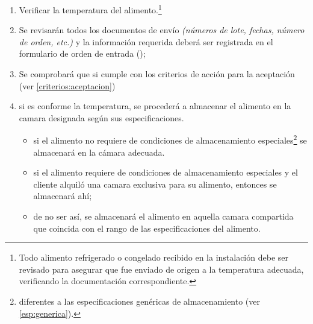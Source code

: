 \begin{enumerate}
\begin{itemize}
		\end{itemize}
	\item Verificar la temperatura del alimento.\footnote{Todo alimento refrigerado o congelado recibido en la instalación debe ser revisado para asegurar que fue enviado de origen a la temperatura adecuada, verificando la documentación correspondiente.}
	\item Se revisarán todos los documentos de envío \emph{(números de lote, fechas, número de orden, etc.)} y la información requerida deberá ser registrada en el formulario de orden de entrada (\Oent);
	\item Se comprobará que si cumple con los criterios de acción para la aceptación (ver \cref{criterios:aceptacion})
	\item si es conforme la temperatura, se procederá a almacenar el alimento en la camara designada según sus especificaciones.
	      \begin{itemize}
		      \item si el \gls{alimento} no requiere de condiciones de almacenamiento especiales\footnote{diferentes a las especificaciones genéricas de almacenamiento (ver \cref{esp:generica}).} se almacenará en la cámara adecuada.
		      \item si el \gls{alimento} requiere de condiciones de almacenamiento especiales y el cliente alquiló una camara exclusiva para su alimento, entonces se almacenará ahí;
		      \item de no ser así, se almacenará el \gls{alimento} en aquella camara compartida que coincida con el rango de las especificaciones del alimento.
	      \end{itemize}
\end{enumerate}

